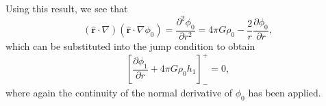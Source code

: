 Using this result, we see that
\begin{equation*}
    (\hat{\mathbf{r}}\cdot\nabla)(\hat{\mathbf{r}}\cdot\nabla\phi_{0}) = \frac{\partial^{2}\phi_{0}}{\partial r^{2}}=4\pi G\rho_{0}-\frac{2}{r}\frac{\partial\phi_{0}}{\partial r},
\end{equation*}
which can be substituted into the jump condition to obtain
\begin{equation*}
    \left[\frac{\partial\phi_{1}}{\partial r}+4\pi G\rho_{0}h_{1}\right]_{-}^{+}=0,
\end{equation*}
where again the continuity of the normal derivative of $\phi_{0}$ has been applied.
